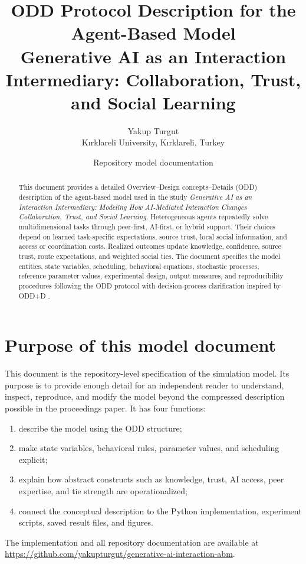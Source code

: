\documentclass[11pt]{article}
\title{ODD Protocol Description for the Agent-Based Model\\\large Generative AI as an Interaction Intermediary: Collaboration, Trust, and Social Learning}
\author{Yakup Turgut\\K\i rklareli University, K\i rklareli, Turkey}
\date{Repository model documentation}
\begin{document}
\maketitle

\begin{abstract}
This document provides a detailed Overview--Design concepts--Details (ODD) description of the agent-based model used in the study \emph{Generative AI as an Interaction Intermediary: Modeling How AI-Mediated Interaction Changes Collaboration, Trust, and Social Learning}. Heterogeneous agents repeatedly solve multidimensional tasks through peer-first, AI-first, or hybrid support. Their choices depend on learned task-specific expectations, source trust, local social information, and access or coordination costs. Realized outcomes update knowledge, confidence, source trust, route expectations, and weighted social ties. The document specifies the model entities, state variables, scheduling, behavioral equations, stochastic processes, reference parameter values, experimental design, output measures, and reproducibility procedures following the ODD protocol \cite{grimm2006standard,grimm2010odd,grimm2020odd} with decision-process clarification inspired by ODD+D \cite{muller2013odd}.
\end{abstract}

\tableofcontents
\newpage

\section{Purpose of this model document}
This document is the repository-level specification of the simulation model. Its purpose is to provide enough detail for an independent reader to understand, inspect, reproduce, and modify the model beyond the compressed description possible in the proceedings paper. It has four functions:
\begin{enumerate}
\item describe the model using the ODD structure;
\item make state variables, behavioral rules, parameter values, and scheduling explicit;
\item explain how abstract constructs such as knowledge, trust, AI access, peer expertise, and tie strength are operationalized;
\item connect the conceptual description to the Python implementation, experiment scripts, saved result files, and figures.
\end{enumerate}
The implementation and all repository documentation are available at \url{https://github.com/yakupturgut/generative-ai-interaction-abm}.
\end{document}
